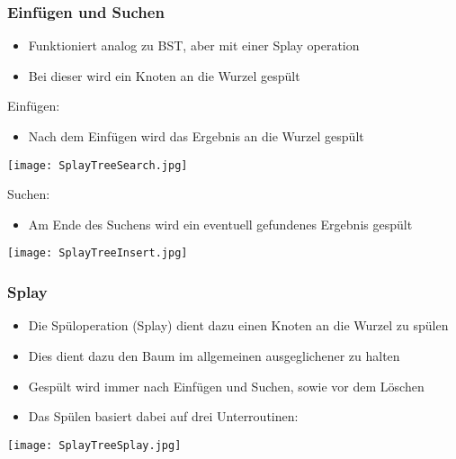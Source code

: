 		\subsubsection{Einfügen und Suchen}
			\begin{itemize}
				\item Funktioniert analog zu BST, aber mit einer Splay operation
				\item Bei dieser wird ein Knoten an die Wurzel gespült
			\end{itemize}
			\begin{minipage}[t]{0.45\textwidth}
				\begin{center}
					Einfügen: \\
				\end{center}
				\begin{itemize}
					\item Nach dem Einfügen wird das Ergebnis an die Wurzel gespült
				\end{itemize}
				\begin{center}
					\texttt{[image: SplayTreeSearch.jpg]}
				\end{center}
			\end{minipage}
			\hspace{1cm}
			\begin{minipage}[t]{0.5\textwidth}
				\begin{center}
					Suchen: \\
				\end{center}
				\begin{itemize}
					\item Am Ende des Suchens wird ein eventuell gefundenes Ergebnis gespült
				\end{itemize}
				\begin{center}
					\texttt{[image: SplayTreeInsert.jpg]}
				\end{center}
			\end{minipage}

		\subsubsection{Splay}
			\begin{minipage}{0.55\textwidth}
				\begin{itemize}
					\item Die Spüloperation (Splay) dient dazu einen Knoten an die Wurzel zu spülen
					\item Dies dient dazu den Baum im allgemeinen ausgeglichener zu halten
					\item Gespült wird immer nach Einfügen und Suchen, sowie vor dem Löschen
					\item Das Spülen basiert dabei auf drei Unterroutinen: \\
				\end{itemize}
			\end{minipage}
			\hspace{1cm}
			\begin{minipage}{0.4\textwidth}
				\begin{center}
					\texttt{[image: SplayTreeSplay.jpg]}
				\end{center}
			\end{minipage}

